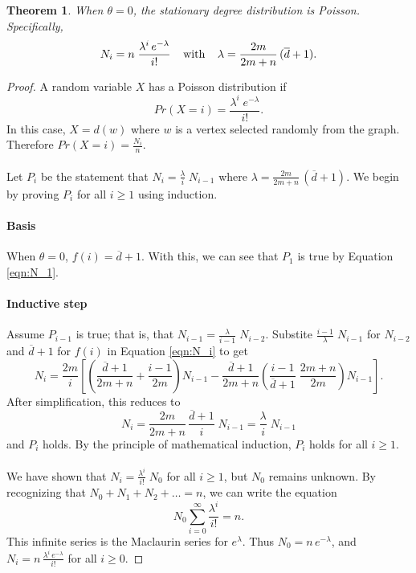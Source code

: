\documentclass[a4paper,10pt]{article}
\newtheorem{theorem}{Theorem}
\begin{document}
\begin{theorem}
 When $\theta=0$, the stationary degree distribution is Poisson. Specifically,
 \begin{equation}
  N_i = n \;\frac{\lambda^i \, e^{-\lambda}}{i!} \mbox{\;\;\;\;with\;\;\;\;} \lambda = \frac{2m}{2m+n}\,(\overline{d} + 1).
 \end{equation}
 \end{theorem}
\begin{proof}
 A random variable $X$ has a Poisson distribution if
 \begin{equation}
  Pr(X=i)=\frac{\lambda^i\;e^{-\lambda}}{i!}.
 \end{equation}
In this case, $X = d(w)$ where $w$ is a vertex selected randomly from the graph. Therefore $Pr(X=i)=\frac{N_i}{n}$.\\\\
Let $P_i$ be the statement that $N_i = \frac{\lambda}{i} \; N_{i - 1}$ where $\lambda = \frac{2m}{2m+n}\,(\overline{d} + 1).$ We begin by proving $P_i$ for all $i \geq 1$ using induction.
\paragraph{Basis}
When $\theta=0$, $f(i) = \overline{d} + 1.$ With this, we can see that $P_1$ is true by Equation \ref{eqn:N_1}.
\paragraph{Inductive step} Assume $P_{i - 1}$ is true; that is, that $N_{i - 1} = \frac{\lambda}{i - 1} \; N_{i - 2}$. Substite $\frac{i - 1}{\lambda} \; N_{i - 1}$ for $N_{i - 2}$ and $\overline{d} + 1$ for $f(i)$ in Equation \ref{eqn:N_i} to get
\begin{equation}
 N_{i} = \frac{2m}{i}\left[\left( \frac{\overline{d}+1}{2m + n} + \frac{i - 1}{2m} \right) N_{i - 1} - \frac{\overline{d}+1}{2m + n} \left( \frac{i - 1}{\overline{d} + 1} \; \frac{2m + n}{2m} \right) N_{i - 1}\right].
\end{equation}
After simplification, this reduces to
\begin{equation}
 N_i = \frac{2m}{2m+n}\,\frac{\overline{d} + 1}{i} \; N_{i - 1} = \frac{\lambda}{i} \;N_{i - 1}
\end{equation}
and $P_i$ holds. By the principle of mathematical induction, $P_i$ holds for all $i \geq 1.$
\\\\
We have shown that $N_i = \frac{\lambda^i}{i!} \; N_0$ for all $i \geq 1$, but $N_0$ remains unknown. By recognizing that $N_0 + N_1 + N_2 + \ldots = n$, we can write the equation
\begin{equation}
 N_0 \sum\limits_{i=0}^\infty \frac{\lambda^i}{i!} = n.
\end{equation}
This infinite series is the Maclaurin series for $e^\lambda$. Thus $N_0 = n\, e^{-\lambda}$, and $N_i = n \,\frac{\lambda^i \, e^{-\lambda}}{i!}$ for all $i \geq 0$.

\end{proof}
\end{document}
